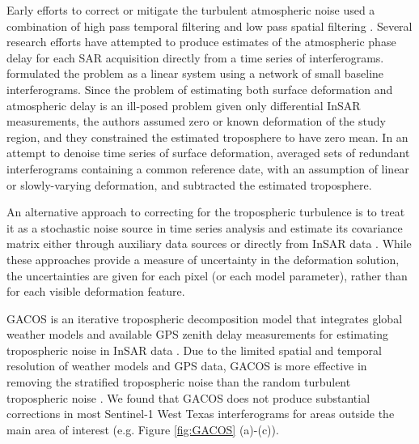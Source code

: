 Early efforts to correct or mitigate the turbulent atmospheric noise used a combination of high pass temporal filtering and low pass spatial filtering \citep{Ferretti2001PermanentScatterersSar, Berardino2002NewAlgorithmSurface}.
Several research efforts have attempted to produce estimates of the atmospheric phase delay for each SAR acquisition directly from a time series of interferograms. \citep{Liu2012SatelliteRadarInterferometry} formulated the problem as a linear system using a network of small baseline interferograms. Since the problem of estimating both surface deformation and atmospheric delay is an ill-posed problem given only differential InSAR measurements, the authors assumed zero or known deformation of the study region, and they constrained the estimated troposphere to have zero mean. In an attempt to denoise time series of surface deformation, \citep{Tymofyeyeva2015MitigationAtmosphericPhase} averaged sets of redundant interferograms containing a common reference date, with an assumption of linear or slowly-varying deformation, and subtracted the estimated troposphere.

An alternative approach to correcting for the tropospheric turbulence is to treat it as a stochastic noise source in time series analysis \citep{Simons2007InterferometricSyntheticAperture, Agram2015NoiseModelInsar} and estimate its covariance matrix either through auxiliary data sources \citep{Barnhart2013CharacterizingEstimatingNoise, Parker2015SystematicAssessmentAtmospheric} or directly from InSAR data \citep{Lohman2005SomeThoughtsUse}. While these approaches provide a measure of uncertainty in the deformation solution, the uncertainties are given for each pixel (or each model parameter), rather than for each visible deformation feature.




GACOS is an iterative tropospheric decomposition model that integrates global weather models and available GPS zenith delay measurements for estimating tropospheric noise in InSAR data \citep{Yu2018InterferometricSyntheticAperture}. Due to the limited spatial and temporal resolution of weather models and GPS data, GACOS is more effective in removing the stratified tropospheric noise \citep{Doin2009CorrectionsStratifiedTropospheric} than the random turbulent tropospheric noise \citep{Emardson2003NeutralAtmosphericDelay}. 
We found that GACOS does not produce substantial corrections in most Sentinel-1 West Texas interferograms for areas outside the main area of interest (e.g. Figure \ref{fig:GACOS} (a)-(c)). 

